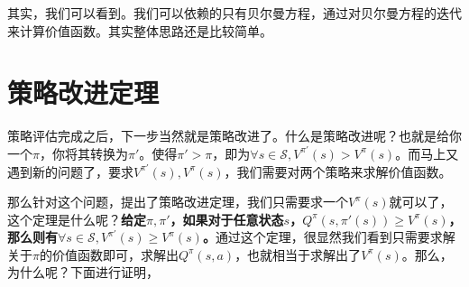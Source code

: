 \documentclass[a4paper]{article}
\begin{document}
其实，我们可以看到。我们可以依赖的只有贝尔曼方程，通过对贝尔曼方程的迭代来计算价值函数。其实整体思路还是比较简单。

\section{策略改进定理}
策略评估完成之后，下一步当然就是策略改进了。什么是策略改进呢？也就是给你一个$\pi$，你将其转换为$\pi'$。使得$\pi'>\pi$，即为$\forall s\in \mathcal{S},V^{\pi'}(s) > V^{\pi}(s)$。而马上又遇到新的问题了，要求$V^{\pi'}(s),V^{\pi}(s)$，我们需要对两个策略来求解价值函数。

那么针对这个问题，提出了策略改进定理，我们只需要求一个$V^{\pi}(s)$就可以了，这个定理是什么呢？\textbf{给定$\pi,\pi'$，如果对于任意状态$s$，$Q^\pi(s,\pi'(s))\geq V^\pi(s)$，那么则有$\forall s\in \mathcal{S}, V^{\pi'}(s) \geq V^\pi(s)$。}通过这个定理，很显然我们看到只需要求解关于$\pi$的价值函数即可，求解出$Q^\pi(s,a)$，也就相当于求解出了$V^\pi(s)$。那么，为什么呢？下面进行证明，
\end{document}
